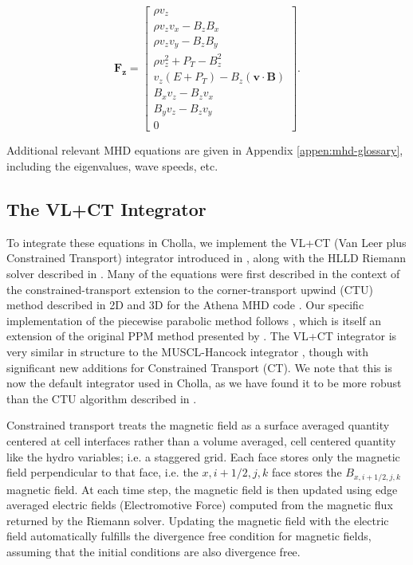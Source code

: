 \begin{equation}
    \boldsymbol{F_z} = \begin{bmatrix}
            \rho v_{z} \\
            \rho v_{z} v_{x} - B_{z} B_{x} \\
            \rho v_{z} v_{y} - B_{z} B_{y} \\
            \rho v_{z}^2 + P_{T} - B_{z}^2 \\
            v_{z} \left( E + P_{T} \right) - B_{z} \left( \boldsymbol{v} \cdot \boldsymbol{B} \right) \\
            B_{x} v_{z} - B_{z} v_{x} \\
            B_{y} v_{z} - B_{z} v_{y} \\
            0
         \end{bmatrix}.
\end{equation}

Additional relevant MHD equations are given in Appendix \ref{appen:mhd-glossary}, including the eigenvalues, wave speeds, etc.



\subsection{The VL+CT Integrator}
\label{sec:vlct-summary}

To integrate these equations in Cholla, we implement the VL+CT (Van Leer plus Constrained Transport) integrator introduced in \cite{stone_2009}, along with the HLLD Riemann solver described in \cite{hlld_2005}. Many of the equations were first described in the context of the constrained-transport extension to the corner-transport upwind (CTU) method \citep{colella_1990} described in 2D \citep{gardiner_2005} and 3D \citep{gardiner_unsplit_2008} for the Athena MHD code \citep{stone_athena_2008}. Our specific implementation of the piecewise parabolic method follows \cite{felker_2018}, which is itself an extension of the original PPM method presented by \cite{collela_1984}. The VL+CT integrator is very similar in structure to the MUSCL-Hancock integrator \citep{van_leer_2003, falle_1991, Toro}, though with significant new additions for Constrained Transport (CT). We note that this is now the default integrator used in Cholla, as we have found it to be more robust than the CTU algorithm described in \cite{schneider_2015}.

Constrained transport treats the magnetic field as a surface averaged quantity centered at cell interfaces rather than a volume averaged, cell centered quantity like the hydro variables; i.e. a staggered grid. Each face stores only the magnetic field perpendicular to that face, i.e. the $x,i+1/2,j,k$ face stores the $B_{x,i+1/2,j,k}$ magnetic field. At each time step, the magnetic field is then updated using edge averaged electric fields (Electromotive Force) computed from the magnetic flux returned by the Riemann solver. Updating the magnetic field with the electric field automatically fulfills the divergence free condition for magnetic fields, assuming that the initial conditions are also divergence free.

